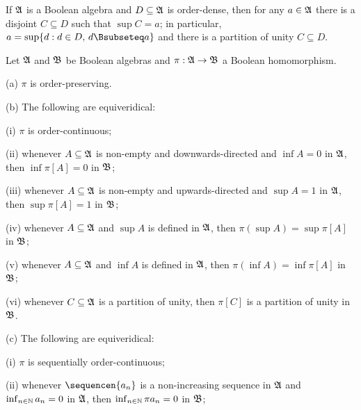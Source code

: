  If $\frak A$ is a Boolean algebra and
$D\subseteq\frak A$ is order-dense, then for any $a\in\frak A$ there is
a disjoint $C\subseteq D$ such that $\sup C=a$;  in particular,
$a=\sup\{d:d\in D,\,d\Bsubseteq a\}$ and there is a
partition of unity $C\subseteq D$.


 Let $\frak A$ and $\frak B$ be Boolean
algebras and $\pi:\frak A\to\frak B$ a Boolean homomorphism.

(a) $\pi$ is order-preserving.

(b) The following are equiveridical:

\quad (i) $\pi$ is order-continuous;

\quad (ii) whenever $A\subseteq\frak A$ is non-empty and
downwards-directed and $\inf A=0$ in $\frak A$, then $\inf\pi[A]=0$ in
$\frak B$;

\quad (iii) whenever $A\subseteq\frak A$ is non-empty and
upwards-directed and $\sup A=1$ in $\frak A$, then $\sup\pi[A]=1$ in
$\frak B$;

\quad (iv) whenever $A\subseteq\frak A$ and $\sup A$ is defined in
$\frak A$, then $\pi(\sup A)=\sup\pi[A]$ in $\frak B$;

\quad (v) whenever $A\subseteq\frak A$ and $\inf A$ is defined in
$\frak A$, then $\pi(\inf A)=\inf\pi[A]$ in $\frak B$;

\quad (vi) whenever $C\subseteq\frak A$ is a partition of unity, then
$\pi[C]$ is a partition of unity in $\frak B$.

(c) The following are equiveridical:

\quad (i) $\pi$ is sequentially order-continuous;

\quad (ii) whenever $\sequencen{a_n}$ is a non-increasing sequence in
$\frak A$ and $\inf_{n\in\Bbb N}a_n=0$ in $\frak A$, then
$\inf_{n\in\Bbb N}\pi a_n=0$ in $\frak B$;

